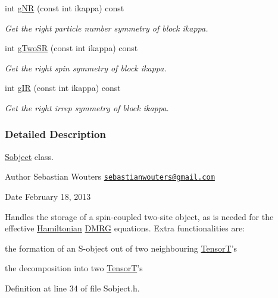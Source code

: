 \begin{DoxyCompactItemize}
int \hyperlink{classCheMPS2_1_1Sobject_a6dc776c7b9c79a2fb5a5e6e81d190562}{g\-N\-R} (const int ikappa) const 
\begin{DoxyCompactList}\small\item\em Get the right particle number symmetry of block ikappa. \end{DoxyCompactList}\item 
int \hyperlink{classCheMPS2_1_1Sobject_ac3d208dc1bc37fdbcf48aaa9e4cc6ed7}{g\-Two\-S\-R} (const int ikappa) const 
\begin{DoxyCompactList}\small\item\em Get the right spin symmetry of block ikappa. \end{DoxyCompactList}\item 
int \hyperlink{classCheMPS2_1_1Sobject_a1a9a06b257e018439ded8c1bf9c88813}{g\-I\-R} (const int ikappa) const 
\begin{DoxyCompactList}\small\item\em Get the right irrep symmetry of block ikappa. \end{DoxyCompactList}\end{DoxyCompactItemize}


\subsubsection{Detailed Description}
\hyperlink{classCheMPS2_1_1Sobject}{Sobject} class. \begin{DoxyAuthor}{Author}
Sebastian Wouters \href{mailto:sebastianwouters@gmail.com}{\tt sebastianwouters@gmail.\-com} 
\end{DoxyAuthor}
\begin{DoxyDate}{Date}
February 18, 2013
\end{DoxyDate}
Handles the storage of a spin-\/coupled two-\/site object, as is needed for the effective \hyperlink{classCheMPS2_1_1Hamiltonian}{Hamiltonian} \hyperlink{classCheMPS2_1_1DMRG}{D\-M\-R\-G} equations. Extra functionalities are\-:
\begin{DoxyItemize}
\item the formation of an S-\/object out of two neighbouring \hyperlink{classCheMPS2_1_1TensorT}{Tensor\-T}'s
\item the decomposition into two \hyperlink{classCheMPS2_1_1TensorT}{Tensor\-T}'s 
\end{DoxyItemize}

Definition at line 34 of file Sobject.\-h.



